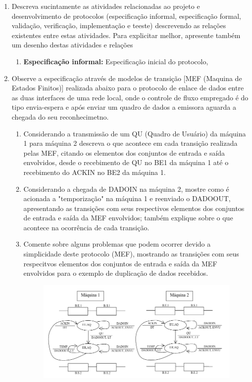 \documentclass[10pt]{article}
\begin{document}
\begin{enumerate}
    \item Descreva sucintamente as atividades relacionadas ao projeto e desenvolvimento
    de protocolos (especificação informal, especificação formal, validação, 
    verificação, implementação e teeste) descrevendo as relações existentes entre estas
    atividades. Para explicitar melhor, apresente também um desenho destas atividades e
    relações 

    \begin{enumerate}
        \item \textbf{Especificação informal:} Especificação inicial do protocolo,

    \end{enumerate}

    \item Observe a especificação através de modelos de transição [MEF (Maquina 
    de Estados Finitos)] realizada abaixo para o protocolo de enlace de dados entre
    as duas interfaces de uma rede local, onde o controle de fluxo empregado é do tipo
    envia-espera e após enviar um quadro de dados a emissora aguarda a chegada do seu
    reconhecimetno.
    \begin{enumerate}
        \item Considerando a transmissão de um QU (Quadro de Usuário) da máquina 1 
        para máquina 2 descreva o que acontece em cada transição realizada pelas MEF,
        citando os elementos dos conjuntos de entrada e saída envolvidos, desde
        o recebimento de QU no BE1 da máquina 1 até o recebimento do ACKIN no BE2 da
        máquina 1.
        \item Considerando a chegada de DADOIN na máquina 2, mostre como é acionada
        a "temporização" na máquina 1 e reenviado o DADOOUT, apresentando as transições
        com seus respectivos elementos dos conjuntos de entrada e saída da MEF 
        envolvidos; também explique sobre o que acontece na ocorrência de cada 
        transição. 
        \item Comente sobre alguns problemas que podem ocorrer devido a simplicidade 
        deste protocolo (MEF), mostrando as transições com seus respecitvos elementos
        dos conjuntos de entrada e saída da MEF envolvidos para o exemplo de duplicação
        de dados recebidos.
        \begin{figure}[h!]
            \includegraphics[width=\linewidth]{mef.png}

\end{figure}
\end{enumerate}
\end{enumerate}
\end{document}
